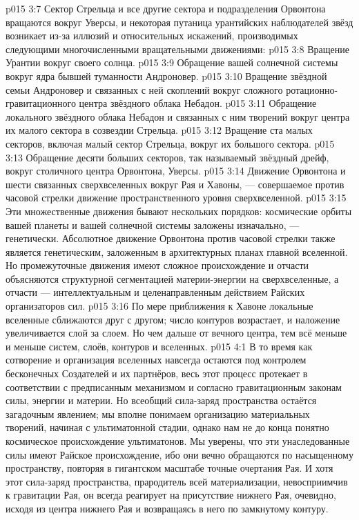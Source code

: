 \vs p015 3:7 \pc Сектор Стрельца и все другие сектора и подразделения Орвонтона вращаются вокруг Уверсы, и некоторая путаница урантийских наблюдателей звёзд возникает из\hyp{}за иллюзий и относительных искажений, производимых следующими многочисленными вращательными движениями:
\vs p015 3:8 Вращение Урантии вокруг своего солнца.
\vs p015 3:9 Обращение вашей солнечной системы вокруг ядра бывшей туманности Андроновер.
\vs p015 3:10 Вращение звёздной семьи Андроновер и связанных с ней скоплений вокруг сложного ротационно\hyp{}гравитационного центра звёздного облака Небадон.
\vs p015 3:11 Обращение локального звёздного облака Небадон и связанных с ним творений вокруг центра их малого сектора в созвездии Стрельца.
\vs p015 3:12 Вращение ста малых секторов, включая малый сектор Стрельца, вокруг их большого сектора.
\vs p015 3:13 Обращение десяти больших секторов, так называемый звёздный дрейф, вокруг столичного центра Орвонтона, Уверсы.
\vs p015 3:14 Движение Орвонтона и шести связанных сверхвселенных вокруг Рая и Хавоны, --- совершаемое против часовой стрелки движение пространственного уровня сверхвселенной.
\vs p015 3:15 \pc Эти множественные движения бывают нескольких порядков: космические орбиты вашей планеты и вашей солнечной системы заложены изначально, --- генетически. Абсолютное движение Орвонтона против часовой стрелки также является генетическим, заложенным в архитектурных планах главной вселенной. Но промежуточные движения имеют сложное происхождение и отчасти объясняются структурной сегментацией материи\hyp{}энергии на сверхвселенные, а отчасти --- интеллектуальным и целенаправленным действием Райских организаторов сил.
\vs p015 3:16 \pc По мере приближения к Хавоне локальные вселенные сближаются друг с другом; число контуров возрастает, и наложение увеличивается слой за слоем. Но чем дальше от вечного центра, тем всё меньше и меньше систем, слоёв, контуров и вселенных.
\vs p015 4:1 В то время как сотворение и организация вселенных навсегда остаются под контролем бесконечных Создателей и их партнёров, весь этот процесс протекает в соответствии с предписанным механизмом и согласно гравитационным законам силы, энергии и материи. Но всеобщий сила\hyp{}заряд пространства остаётся загадочным явлением; мы вполне понимаем организацию материальных творений, начиная с ультиматонной стадии, однако нам не до конца понятно космическое происхождение ультиматонов. Мы уверены, что эти унаследованные силы имеют Райское происхождение, ибо они вечно обращаются по насыщенному пространству, повторяя в гигантском масштабе точные очертания Рая. И хотя этот сила\hyp{}заряд пространства, прародитель всей материализации, невосприимчив к гравитации Рая, он всегда реагирует на присутствие нижнего Рая, очевидно, исходя из центра нижнего Рая и возвращаясь в него по замкнутому контуру.
